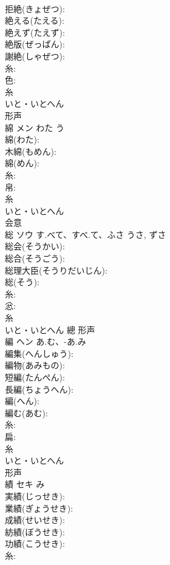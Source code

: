 \documentclass[8pt]{extreport}
\begin{document}
\begin{CJK}{UTF8}{min}
\\	拒絶(きょぜつ): 
\\	絶える(たえる): 
\\	絶えず(たえず): 
\\	絶版(ぜっぱん): 
\\	謝絶(しゃぜつ): 
\\	糸: 
\\	色: 
\\	糸	
\\	いと・いとへん	
\\	形声 
\\	綿	メン	わた	う	
\\	綿(わた): 
\\	木綿(もめん): 
\\	綿(めん): 
\\	糸: 
\\	帛: 
\\	糸	
\\	いと・いとへん	
\\	会意 
\\	総	ソウ	す.べて、すべ.て、ふさ	うさ, ずさ	
\\	総会(そうかい): 
\\	総合(そうごう): 
\\	総理大臣(そうりだいじん): 
\\	総(そう): 
\\	糸: 
\\	忩: 
\\	糸	
\\	いと・いとへん	總	形声 
\\	編	ヘン	あ.む、-あ.み		
\\	編集(へんしゅう): 
\\	編物(あみもの): 
\\	短編(たんぺん): 
\\	長編(ちょうへん): 
\\	編(へん): 
\\	編む(あむ): 
\\	糸: 
\\	扁: 
\\	糸	
\\	いと・いとへん	
\\	形声 
\\	績	セキ		み	
\\	実績(じっせき): 
\\	業績(ぎょうせき): 
\\	成績(せいせき): 
\\	紡績(ぼうせき): 
\\	功績(こうせき): 
\\	糸: 

\end{CJK}
\end{document}
